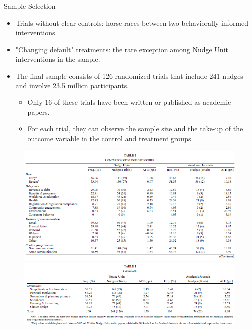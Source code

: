\documentclass[dvipdfmx,11pt]{beamer}
\begin{document}
\begin{frame}{Sample Selection}
  \begin{itemize}
    \item Trials without clear controls: horse races between two behaviorally-informed interventions.
    \item "Changing default" treatments: the rare exception among Nudge Unit interventions in the sample.
    \item The final sample consists of 126 randomized trials that include 241 nudges and involve 23.5 million participants.
    \begin{itemize}
      \item Only 16 of these trials have been written or published as academic papers.
      \item For each trial, they can observe the sample size and the take-up of the outcome variable in the control and treatment groups.
    \end{itemize}
  \end{itemize}
\end{frame}

\begin{frame}{}
  \begin{figure}
    \centering
    \includegraphics[scale = .5]{fig_tab/os20220412/T1}
    \includegraphics[scale = .5]{fig_tab/os20220412/T1b.png}
  \end{figure}
\end{frame}
\end{document}
